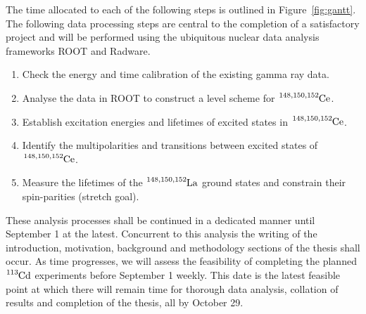 \documentclass[12pt,a4paper]{article}
\begin{document}
\medskip
\noindent
The time allocated to each of the following steps is outlined in Figure~\ref{fig:gantt}.
The following data processing steps are central to the completion of a satisfactory project and will be performed using the ubiquitous nuclear data analysis frameworks ROOT and Radware.
\begin{enumerate}
\item Check the energy and time calibration of the existing gamma ray data.
\item Analyse the data in ROOT to construct a level scheme for $\ce{^{148,150,152}Ce}$.
\item Establish excitation energies and lifetimes of excited states in $\ce{^{148,150,152}Ce}$.
\item Identify the multipolarities and transitions between excited states of $\ce{^{148,150,152}Ce}$.
\item Measure the lifetimes of the $\ce{^{148,150,152}La}$ ground states and constrain their spin-parities (stretch goal).
\end{enumerate}

\medskip
\noindent
These analysis processes shall be continued in a dedicated manner until September 1 at the latest.
Concurrent to this analysis the writing of the introduction, motivation, background and methodology sections of the thesis shall occur. 
As time progresses, we will assess the feasibility of completing the planned $\ce{^{113}Cd}$ experiments before September 1 weekly.
This date is the latest feasible point at which there will remain time for thorough data analysis, collation of results and completion of the thesis, all by October 29.
\end{document}
